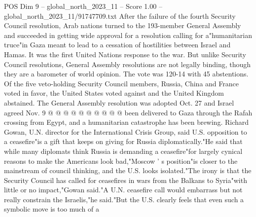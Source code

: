 \begin{textsample}{POS Dim 9 – global\_north\_2023\_11 – Score 1.00 – global\_north\_2023\_11/91747709.txt}
After the failure of the fourth Security Council resolution, Arab nations turned to the 193-member General Assembly and succeeded in getting wide approval for a resolution calling for a"humanitarian truce"in Gaza meant to lead to a cessation of hostilities between Israel and Hamas.
It was the first United Nations response to the war.
But unlike Security Council resolutions, General Assembly resolutions are not legally binding, though they are a barometer of world opinion.
The vote was 120-14 with 45 abstentions.
Of the five veto-holding Security Council members, Russia, China and France voted in favor, the United States voted against and the United Kingdom abstained.
The General Assembly resolution was adopted Oct. 27 and Israel agreed Nov. 9 @ @ @ @ @ @ @ @ @ @ been delivered to Gaza through the Rafah crossing from Egypt, and a humanitarian catastrophe has been brewing.
Richard Gowan, U.N. director for the International Crisis Group, said U.S. opposition to a ceasefire"is a gift that keeps on giving for Russia diplomatically."He said that while many diplomats think Russia is demanding a ceasefire"for largely cynical reasons to make the Americans look bad,"Moscow ' s position"is closer to the mainstream of council thinking, and the U.S. looks isolated."The irony is that the Security Council has called for ceasefires in wars from the Balkans to Syria"with little or no impact,"Gowan said."A U.N. ceasefire call would embarrass but not really constrain the Israelis,"he said."But the U.S. clearly feels that even such a symbolic move is too much of a

\end{textsample}

